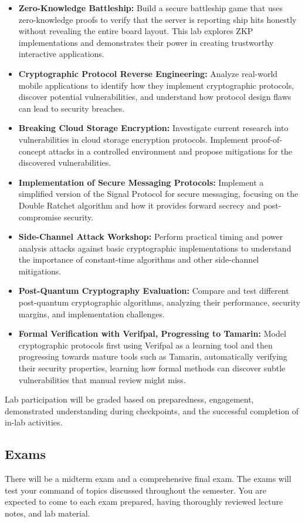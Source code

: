 \documentclass[10pt,a4paper,american]{article}
\begin{document}
\begin{itemize}
	\item \textbf{Zero-Knowledge Battleship:} Build a secure battleship game that uses zero-knowledge proofs to verify that the server is reporting ship hits honestly without revealing the entire board layout. This lab explores ZKP implementations and demonstrates their power in creating trustworthy interactive applications.
	\item \textbf{Cryptographic Protocol Reverse Engineering:} Analyze real-world mobile applications to identify how they implement cryptographic protocols, discover potential vulnerabilities, and understand how protocol design flaws can lead to security breaches.
	\item \textbf{Breaking Cloud Storage Encryption:} Investigate current research into vulnerabilities in cloud storage encryption protocols. Implement proof-of-concept attacks in a controlled environment and propose mitigations for the discovered vulnerabilities.
	\item \textbf{Implementation of Secure Messaging Protocols:} Implement a simplified version of the Signal Protocol for secure messaging, focusing on the Double Ratchet algorithm and how it provides forward secrecy and post-compromise security.
	\item \textbf{Side-Channel Attack Workshop:} Perform practical timing and power analysis attacks against basic cryptographic implementations to understand the importance of constant-time algorithms and other side-channel mitigations.
	\item \textbf{Post-Quantum Cryptography Evaluation:} Compare and test different post-quantum cryptographic algorithms, analyzing their performance, security margins, and implementation challenges.
	\item \textbf{Formal Verification with Verifpal, Progressing to Tamarin:} Model cryptographic protocols first using Verifpal as a learning tool and then progressing towards mature tools such as Tamarin, automatically verifying their security properties, learning how formal methods can discover subtle vulnerabilities that manual review might miss.
\end{itemize}

Lab participation will be graded based on preparedness, engagement, demonstrated understanding during checkpoints, and the successful completion of in-lab activities.

\subsection{Exams}
There will be a midterm exam and a comprehensive final exam. The exams will test your command of topics discussed throughout the semester. You are expected to come to each exam prepared, having thoroughly reviewed lecture notes, and lab material.
\end{document}

